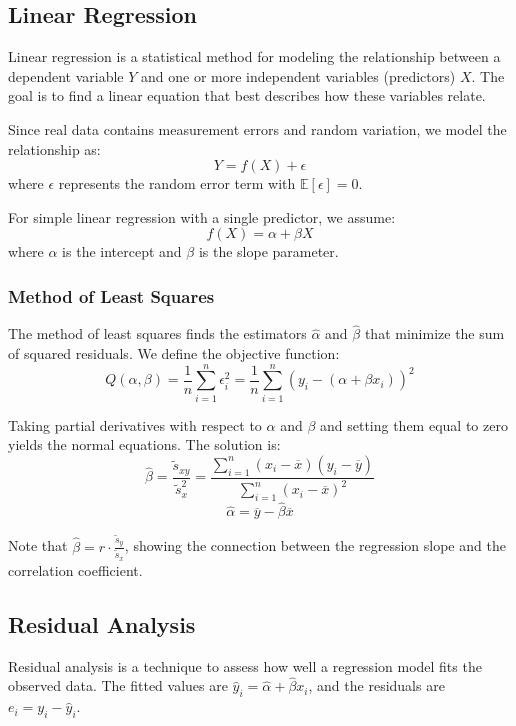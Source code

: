 \documentclass{article}
\begin{document}
\subsection{Linear Regression}

Linear regression is a statistical method for modeling the relationship between a dependent variable $Y$ and one or more independent variables (predictors) $X$. The goal is to find a linear equation that best describes how these variables relate.

Since real data contains measurement errors and random variation, we model the relationship as:
\[
Y = f(X) + \epsilon
\]
where $\epsilon$ represents the random error term with $\mathbb{E}[\epsilon] = 0$.

For simple linear regression with a single predictor, we assume:
\[
f(X) = \alpha + \beta X
\]
where $\alpha$ is the intercept and $\beta$ is the slope parameter.

\subsubsection{Method of Least Squares}

The method of least squares finds the estimators $\hat{\alpha}$ and $\hat{\beta}$ that minimize the sum of squared residuals. We define the objective function:
\[
Q(\alpha, \beta) = \frac{1}{n}\sum_{i=1}^{n}\epsilon_i^2 = \frac{1}{n}\sum_{i=1}^{n}(y_i - (\alpha + \beta x_i))^2
\]

Taking partial derivatives with respect to $\alpha$ and $\beta$ and setting them equal to zero yields the normal equations. The solution is:
\[
\hat{\beta} = \frac{\tilde{s}_{xy}}{\tilde{s}_x^2} = \frac{\sum_{i=1}^{n}(x_i - \overline{x})(y_i - \overline{y})}{\sum_{i=1}^{n}(x_i - \overline{x})^2}
\]
\[
\hat{\alpha} = \overline{y} - \hat{\beta}\overline{x}
\]

Note that $\hat{\beta} = r \cdot \frac{\tilde{s}_y}{\tilde{s}_x}$, showing the connection between the regression slope and the correlation coefficient.

\subsection{Residual Analysis}

Residual analysis is a technique to assess how well a regression model fits the observed data. The fitted values are $\hat{y}_i = \hat{\alpha} + \hat{\beta}x_i$, and the residuals are $e_i = y_i - \hat{y}_i$.
\end{document}
